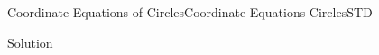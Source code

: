 \begin{MXContent}{Coordinate Equations of Circles}{Coordinate Equations Circles}{STD}
\begin{MExercise}
\begin{MHint}{Solution}
\begin{MExerciseItems}
{}
\end{MExerciseItems}

\end{MHint} 

\end{MExercise}

% 
% 
% 
% 
% 
% 


\end{MXContent}
